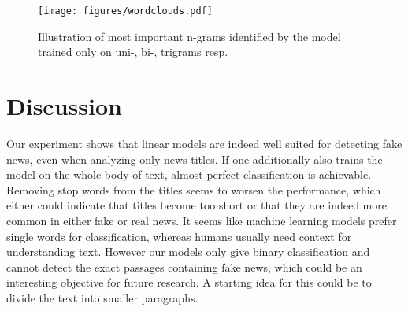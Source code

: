 \documentclass[10pt]{article}
\begin{document}
	\begin{figure}[h!]
		\centering
		\texttt{[image: figures/wordclouds.pdf]}
		\caption{Illustration of most important n-grams identified by the model trained only on uni-, bi-, trigrams resp.}
		\label{Fig 3}
	\end{figure}
	

	
	
	\section{Discussion}
	Our experiment shows that linear models are indeed well suited for detecting fake news, even when analyzing only news titles. If one additionally also trains the model on the whole body of text, almost perfect classification is achievable. Removing stop words from the titles seems to worsen the performance, which either could indicate that titles become too short or that they are indeed more common in either fake or real news. It seems like machine learning models prefer single words for classification, whereas humans usually need context for understanding text. However our models only give binary classification and cannot detect the exact passages containing fake news, which could be an interesting objective for future research. A starting idea for this could be to divide the text into smaller paragraphs. 
	
	
\end{document}
